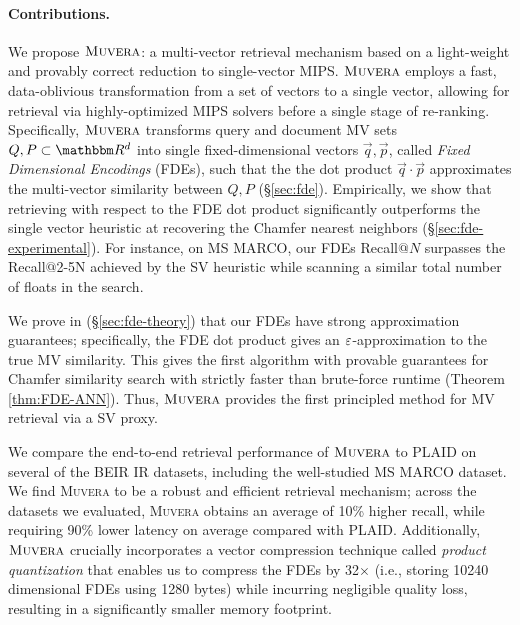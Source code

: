 \documentclass{article}
\newcommand{\name}{\textsc{Muvera}}
\begin{document}
\paragraph{Contributions.}
We propose $\name$: a multi-vector retrieval mechanism based on a light-weight and provably correct reduction to single-vector MIPS. $\name$ employs a fast, data-oblivious transformation from a set of vectors to a single vector, allowing for retrieval via highly-optimized MIPS solvers before a single stage of re-ranking. Specifically, $\name$ transforms query and document MV sets $Q,P \subset \R^d$ into single fixed-dimensional vectors $\vec{q}, \vec{p}$, called \emph{Fixed Dimensional Encodings} (FDEs), such that the the dot product $\vec{q} \cdot \vec{p}$ approximates the multi-vector similarity between $Q,P$ (§\ref{sec:fde}).  Empirically, we show that retrieving with respect to the FDE dot product significantly outperforms the single vector heuristic at recovering the Chamfer nearest neighbors (§\ref{sec:fde-experimental}). For instance, on MS MARCO, our FDEs Recall$@N$ surpasses the Recall$@$2-5N achieved by the SV heuristic while scanning a similar total number of floats in the search. 


We prove in (§\ref{sec:fde-theory}) that our FDEs have strong approximation guarantees; specifically, the FDE dot product gives an $\varepsilon$-approximation to the true MV similarity. This gives the first algorithm with provable guarantees for Chamfer similarity search with strictly faster than brute-force runtime (Theorem \ref{thm:FDE-ANN}). Thus, $\name$ provides the first principled method for MV retrieval via a SV proxy. 


We compare the end-to-end retrieval performance of $\name$ to PLAID on several of the BEIR IR datasets, including the well-studied MS MARCO dataset. 
We find \name{} to be a robust and efficient retrieval mechanism; across the datasets we evaluated, \name{} obtains an average of 10\% higher recall, while requiring 90\% lower latency on average compared with PLAID. Additionally, $\name$ crucially incorporates a vector compression technique called {\em product quantization} that enables us to compress the FDEs by 32$\times$ (i.e., storing 10240 dimensional FDEs using 1280 bytes) while incurring negligible quality loss, resulting in a significantly smaller memory footprint. 
\end{document}
